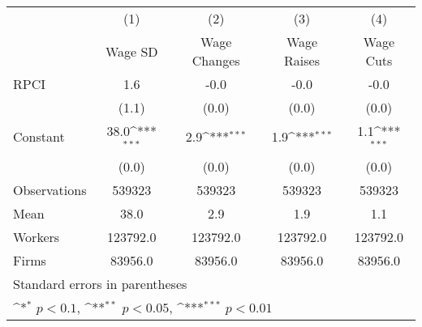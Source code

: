 {
\def\sym#1{\ifmmode^{#1}\else\(^{#1}\)\fi}
\begin{tabular}{l*{4}{c}}
\hline\hline
                    &\multicolumn{1}{c}{(1)}&\multicolumn{1}{c}{(2)}&\multicolumn{1}{c}{(3)}&\multicolumn{1}{c}{(4)}\\
                    &\multicolumn{1}{c}{Wage SD}&\multicolumn{1}{c}{Wage Changes}&\multicolumn{1}{c}{Wage Raises}&\multicolumn{1}{c}{Wage Cuts}\\
\hline
RPCI                &         1.6         &        -0.0         &        -0.0         &        -0.0         \\
                    &       (1.1)         &       (0.0)         &       (0.0)         &       (0.0)         \\
[1em]
Constant            &        38.0\sym{***}&         2.9\sym{***}&         1.9\sym{***}&         1.1\sym{***}\\
                    &       (0.0)         &       (0.0)         &       (0.0)         &       (0.0)         \\
\hline
Observations        &      539323         &      539323         &      539323         &      539323         \\
Mean                &        38.0         &         2.9         &         1.9         &         1.1         \\
Workers             &    123792.0         &    123792.0         &    123792.0         &    123792.0         \\
Firms               &     83956.0         &     83956.0         &     83956.0         &     83956.0         \\
\hline\hline
\multicolumn{5}{l}{\footnotesize Standard errors in parentheses}\\
\multicolumn{5}{l}{\footnotesize \sym{*} \(p<0.1\), \sym{**} \(p<0.05\), \sym{***} \(p<0.01\)}\\
\end{tabular}
}
